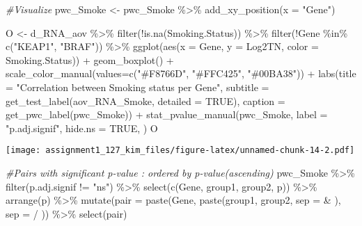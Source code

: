 \documentclass[
]{article}
\newenvironment{Shaded}{\begin{snugshade}}{\end{snugshade}}
\newcommand{\AttributeTok}[1]{\textcolor[rgb]{0.77,0.63,0.00}{#1}}
\newcommand{\CommentTok}[1]{\textcolor[rgb]{0.56,0.35,0.01}{\textit{#1}}}
\newcommand{\ConstantTok}[1]{\textcolor[rgb]{0.00,0.00,0.00}{#1}}
\newcommand{\FunctionTok}[1]{\textcolor[rgb]{0.00,0.00,0.00}{#1}}
\newcommand{\NormalTok}[1]{#1}
\newcommand{\OtherTok}[1]{\textcolor[rgb]{0.56,0.35,0.01}{#1}}
\newcommand{\SpecialCharTok}[1]{\textcolor[rgb]{0.00,0.00,0.00}{#1}}
\newcommand{\StringTok}[1]{\textcolor[rgb]{0.31,0.60,0.02}{#1}}
\begin{document}
\begin{Shaded}
\begin{Highlighting}[]
\CommentTok{\#Visualize}
\NormalTok{pwc\_Smoke }\OtherTok{\textless{}{-}}\NormalTok{ pwc\_Smoke }\SpecialCharTok{\%\textgreater{}\%} \FunctionTok{add\_xy\_position}\NormalTok{(}\AttributeTok{x =} \StringTok{"Gene"}\NormalTok{)}

\NormalTok{O }\OtherTok{\textless{}{-}}\NormalTok{ d\_RNA\_aov }\SpecialCharTok{\%\textgreater{}\%}
  \FunctionTok{filter}\NormalTok{(}\SpecialCharTok{!}\FunctionTok{is.na}\NormalTok{(Smoking.Status)) }\SpecialCharTok{\%\textgreater{}\%}
  \FunctionTok{filter}\NormalTok{(}\SpecialCharTok{!}\NormalTok{Gene }\SpecialCharTok{\%in\%} \FunctionTok{c}\NormalTok{(}\StringTok{"KEAP1"}\NormalTok{, }\StringTok{"BRAF"}\NormalTok{)) }\SpecialCharTok{\%\textgreater{}\%}
  \FunctionTok{ggplot}\NormalTok{(}\FunctionTok{aes}\NormalTok{(}\AttributeTok{x =}\NormalTok{ Gene, }\AttributeTok{y =}\NormalTok{ Log2TN, }\AttributeTok{color =}\NormalTok{ Smoking.Status)) }\SpecialCharTok{+}
  \FunctionTok{geom\_boxplot}\NormalTok{() }\SpecialCharTok{+}
  \FunctionTok{scale\_color\_manual}\NormalTok{(}\AttributeTok{values=}\FunctionTok{c}\NormalTok{(}\StringTok{"\#F8766D"}\NormalTok{, }\StringTok{"\#FFC425"}\NormalTok{, }\StringTok{"\#00BA38"}\NormalTok{)) }\SpecialCharTok{+}
  \FunctionTok{labs}\NormalTok{(}\AttributeTok{title =} \StringTok{"Correlation between Smoking status per Gene"}\NormalTok{,}
    \AttributeTok{subtitle =} \FunctionTok{get\_test\_label}\NormalTok{(aov\_RNA\_Smoke, }\AttributeTok{detailed =} \ConstantTok{TRUE}\NormalTok{),}
    \AttributeTok{caption =} \FunctionTok{get\_pwc\_label}\NormalTok{(pwc\_Smoke)) }\SpecialCharTok{+}
  \FunctionTok{stat\_pvalue\_manual}\NormalTok{(pwc\_Smoke, }\AttributeTok{label =} \StringTok{"p.adj.signif"}\NormalTok{, }\AttributeTok{hide.ns =} \ConstantTok{TRUE}\NormalTok{, )}
\NormalTok{O}
\end{Highlighting}
\end{Shaded}

\texttt{[image: assignment1\_127\_kim\_files/figure-latex/unnamed-chunk-14-2.pdf]}

\begin{Shaded}
\begin{Highlighting}[]
\CommentTok{\#Pairs with significant p{-}value : ordered by p{-}value(ascending)}
\NormalTok{pwc\_Smoke }\SpecialCharTok{\%\textgreater{}\%} 
  \FunctionTok{filter}\NormalTok{(p.adj.signif }\SpecialCharTok{!=} \StringTok{"ns"}\NormalTok{) }\SpecialCharTok{\%\textgreater{}\%}
  \FunctionTok{select}\NormalTok{(}\FunctionTok{c}\NormalTok{(Gene, group1, group2, p)) }\SpecialCharTok{\%\textgreater{}\%}
  \FunctionTok{arrange}\NormalTok{(p) }\SpecialCharTok{\%\textgreater{}\%}
  \FunctionTok{mutate}\NormalTok{(}\AttributeTok{pair =} \FunctionTok{paste}\NormalTok{(Gene, }\FunctionTok{paste}\NormalTok{(group1, group2, }\AttributeTok{sep =} \StringTok{\textquotesingle{} \& \textquotesingle{}}\NormalTok{), }\AttributeTok{sep =} \StringTok{\textquotesingle{}/ \textquotesingle{}}\NormalTok{)) }\SpecialCharTok{\%\textgreater{}\%}
  \FunctionTok{select}\NormalTok{(pair)}
\end{Highlighting}
\end{Shaded}
\end{document}
